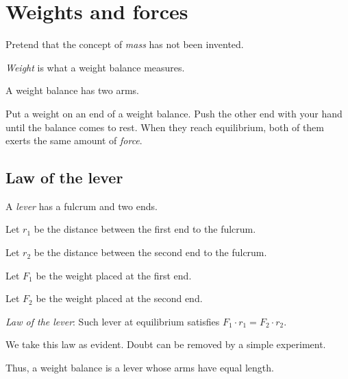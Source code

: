 \chapter{Weights and forces}

Pretend that the concept of \emph{mass} has not been invented.

\emph{Weight} is what a weight balance measures.

A weight balance has two arms.

Put a weight on an end of a weight balance.
Push the other end with your hand until the balance comes to rest.
When they reach equilibrium,
both of them exerts the same amount of \emph{force}.

\section{Law of the lever}


%
%
%
A \emph{lever} has a fulcrum and two ends.

Let \(r_1\) be the distance between the first end to the fulcrum.

Let \(r_2\) be the distance between the second end to the fulcrum.

Let \(F_1\) be the weight placed at the first end.

Let \(F_2\) be the weight placed at the second end.

%
%
%
%
%
\emph{Law of the lever}:
Such lever at equilibrium satisfies \(F_1 \cdot r_1 = F_2 \cdot r_2\).

We take this law as evident.
Doubt can be removed by a simple experiment.

Thus, a weight balance is a lever whose arms have equal length.
